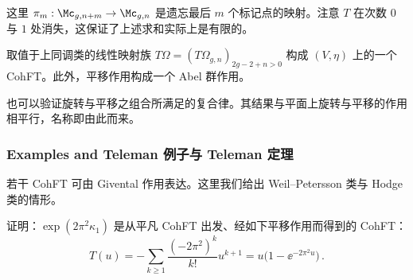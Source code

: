 这里 $\pi_{m}:\Mc_{g,n+m}\to\Mc_{g,n}$ 是遗忘最后 $m$ 个标记点的映射。注意 $T$ 在次数 $0$ 与 $1$ 处消失，这保证了上述求和实际上是有限的。

\begin{proposition}[3.6]
取值于上同调类的线性映射族 $T\Omega=(T\Omega_{g,n})_{2g-2+n>0}$ 构成 $(V,\eta)$ 上的一个 CohFT。此外，平移作用构成一个 Abel 群作用。
\end{proposition}

也可以验证旋转与平移之组合所满足的复合律。其结果与平面上旋转与平移的作用相平行，名称即由此而来。

\subsubsection{Examples and Teleman 例子与 Teleman 定理}

若干 CohFT 可由 Givental 作用表达。这里我们给出 Weil–Petersson 类与 Hodge 类的情形。

\begin{exercise}[3.2]
证明：$\exp(2\pi^{2}\kappa_{1})$ 是从平凡 CohFT 出发、经如下平移作用而得到的 CohFT：
\begin{equation}
  T(u)=-\sum_{k\ge1}\frac{(-2\pi^{2})^{k}}{k!}u^{k+1}=u\big(1-\ee^{-2\pi^{2}u}\big)\,.
  \tag{3.46}
\end{equation}
\end{exercise}

